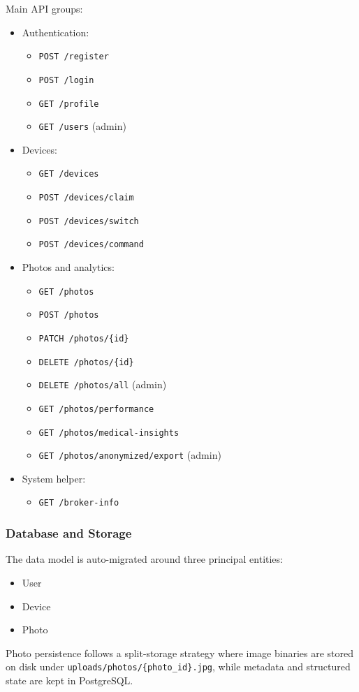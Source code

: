 \documentclass[12pt,a4paper]{article}
\begin{document}
    Main API groups:
    \begin{itemize}[leftmargin=*]
        \item Authentication:
        \begin{itemize}[leftmargin=*]
            \item \texttt{POST /register}
            \item \texttt{POST /login}
            \item \texttt{GET /profile}
            \item \texttt{GET /users} (admin)
        \end{itemize}
        \item Devices:
        \begin{itemize}[leftmargin=*]
            \item \texttt{GET /devices}
            \item \texttt{POST /devices/claim}
            \item \texttt{POST /devices/switch}
            \item \texttt{POST /devices/command}
        \end{itemize}
        \item Photos and analytics:
        \begin{itemize}[leftmargin=*]
            \item \texttt{GET /photos}
            \item \texttt{POST /photos}
            \item \texttt{PATCH /photos/\{id\}}
            \item \texttt{DELETE /photos/\{id\}}
            \item \texttt{DELETE /photos/all} (admin)
            \item \texttt{GET /photos/performance}
            \item \texttt{GET /photos/medical-insights}
            \item \texttt{GET /photos/anonymized/export} (admin)
        \end{itemize}
        \item System helper:
        \begin{itemize}[leftmargin=*]
            \item \texttt{GET /broker-info}
        \end{itemize}
    \end{itemize}

    \subsubsection{Database and Storage}
    The data model is auto-migrated around three principal entities:
    \begin{itemize}[leftmargin=*]
        \item User
        \item Device
        \item Photo
    \end{itemize}
    Photo persistence follows a split-storage strategy where image binaries are
    stored on disk under
    \texttt{uploads/photos/\{photo\_id\}.jpg}, while metadata and structured
    state are kept in PostgreSQL.
\end{document}
